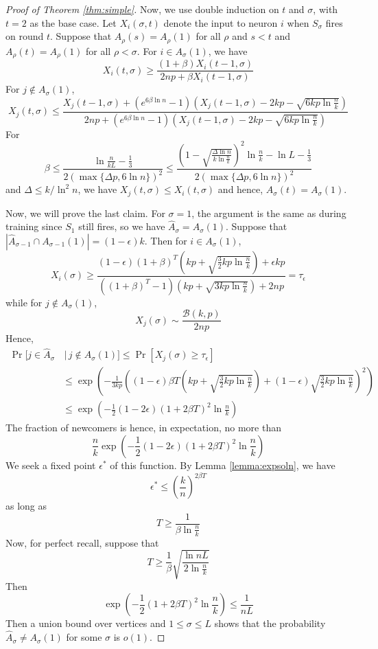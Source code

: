 \documentclass[12pt,nosubfloats]{alt2024} %
\newcommand{\1}{\mathbbm{1}}
\newcommand{\cond}{\, | \,}
\begin{document}
\begin{proof}[Proof of Theorem \ref{thm:simple}]
Now, we use double induction on $t$ and $\sigma$, with $t = 2$ as the base case. Let $X_i(\sigma, t)$ denote the input to neuron $i$ when $S_\sigma$ fires on round $t$. Suppose that $A_{\rho}(s) = A_{\rho}(1)$ for all $\rho$ and $s < t$ and $A_{\rho}(t) = A_{\rho}(1)$ for all $\rho < \sigma$. For $i \in A_\sigma(1)$, we have
\[X_i(t, \sigma) \ge \frac{(1 + \beta) X_i(t-1, \sigma)}{2np + \beta X_i(t-1, \sigma)}\]
For $j \not\in A_\sigma(1)$,
\[X_j(t, \sigma) \le \frac{X_j(t-1, \sigma) + (e^{6\beta \ln n} - 1)(X_j(t-1, \sigma) - 2kp - \sqrt{6 kp \ln \frac{n}{k}})}{2np + (e^{6\beta \ln n} - 1) (X_j(t-1, \sigma) - 2kp - \sqrt{6 kp \ln \frac{n}{k}})}\]
For 
\[\beta \le \frac{ \ln \frac{n}{kL} - \frac{1}{3}}{2 (\max \{\Delta p, 6 \ln n\})^2 } \le \frac{(1 - \sqrt{\frac{\Delta \ln n}{k\ln \frac{n}{k}}})^2 \ln \frac{n}{k} - \ln L - \frac{1}{3}}{2 (\max \{\Delta p, 6 \ln n\})^2 }\]
and $\Delta \le k / \ln^2 n$, we have $X_j(t, \sigma) \le X_i(t, \sigma)$ and hence, $A_{\sigma}(t) = A_\sigma(1)$.

Now, we will prove the last claim. For $\sigma = 1$, the argument is the same as during training since $S_1$ still fires, so we have $\widehat A_\sigma = A_\sigma(1)$. Suppose that $|\widehat A_{\sigma - 1} \cap A_{\sigma-1}(1)| = (1-\epsilon) k$. Then for $i \in A_\sigma(1)$, 
\[X_i(\sigma) \ge \frac{(1 - \epsilon) (1 + \beta)^T (kp + \sqrt{\frac{3}{2}kp \ln \frac{n}{k}}) + \epsilon kp}{((1 + \beta)^T - 1)(kp + \sqrt{3kp \ln \frac{n}{k}}) + 2np} = \tau_\epsilon\]
while for $j \not\in A_\sigma(1)$,
\[X_j(\sigma) \sim \frac{\mathcal B(k, p)}{2np}\]
Hence,
\begin{align*}
    \Pr[j \in \widehat A_\sigma &\cond j \not\in A_\sigma(1)] \le \Pr\left[X_j(\sigma) \ge \tau_\epsilon \right]\\
    &\le \exp\left(-\frac{1}{3kp}\left((1 - \epsilon)\beta T(kp + \sqrt{\frac{3}{2}kp \ln \frac{n}{k}}) + (1 - \epsilon) \sqrt{\frac{3}{2}kp \ln \frac{n}{k}}\right)^2\right)\\
    &\le \exp\left(- \frac{1}{2} (1 - 2\epsilon) (1 + 2\beta T)^2 \ln \frac{n}{k}\right)
\end{align*} The fraction of newcomers is hence, in expectation, no more than
\[\frac{n}{k}\exp\left(- \frac{1}{2}(1 - 2\epsilon) (1 + 2\beta T)^2 \ln \frac{n}{k}\right)\]
We seek a fixed point $\epsilon^*$ of this function. By Lemma \ref{lemma:expsoln}, we have
\[\epsilon^* \le \left(\frac{k}{n}\right)^{2\beta T}\]
as long as
\[T \ge \frac{1}{\beta \ln \frac{n}{k}}\]
Now, for perfect recall, suppose that
\[T  \ge \frac{1}{\beta}\sqrt{\frac{\ln nL}{2\ln \frac{n}{k}}}\]
Then
\[\exp\left(- \frac{1}{2} (1 + 2\beta T)^2 \ln \frac{n}{k}\right) \le \frac{1}{nL}\]
Then a union bound over vertices and $1 \le \sigma \le L$ shows that the probability $\widehat A_\sigma \neq A_\sigma(1)$ for some $\sigma$ is $o(1)$.  
\end{proof}
\end{document}
